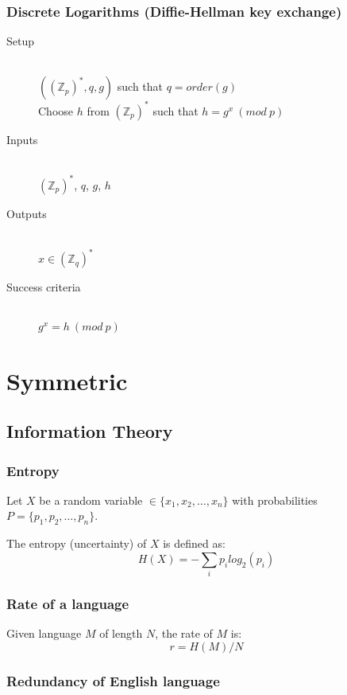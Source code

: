 \documentclass[a4paper]{article}
\begin{document}
\subsubsection{Discrete Logarithms (Diffie-Hellman key exchange)}

\begin{description}
  \item[Setup] \hfill \\
    $((\mathbb{Z}_{p})^{*}, q, g)$ such that $q = order(g)$ \\
    Choose $h$ from $(\mathbb{Z}_{p})^{*}$ such that $h = g^{x} \: (mod \: p)$
  \item[Inputs] \hfill \\
    $(\mathbb{Z}_{p})^{*}$, $q$, $g$, $h$
  \item[Outputs] \hfill \\
    $x \in (\mathbb{Z}_{q})^{*}$
  \item[Success criteria] \hfill \\
    $g^{x} = h \: (mod \: p)$
\end{description}

\section{Symmetric}

\subsection{Information Theory}

\subsubsection{Entropy}

Let $X$ be a random variable $\in \{x_{1}, x_{2}, \ldots,x_{n}\}$ with
probabilities $P = \{p_{1}, p_{2}, \ldots, p_{n}\}$.

The entropy (uncertainty) of $X$ is defined as:
\[
  H(X) = -\sum_{i} p_{i} log_{2}(p_{i})
\]

\subsubsection{Rate of a language}

Given language $M$ of length $N$, the rate of $M$ is:
\[
  r = H(M) / N
\]

\subsubsection{Redundancy of English language}
\end{document}
